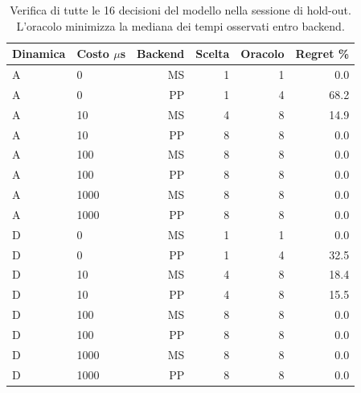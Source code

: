 \begin{table}[H]\centering\small
\caption{Verifica di tutte le 16 decisioni del modello nella sessione di hold-out. L'oracolo minimizza la mediana dei tempi osservati entro backend.}\label{tab:regret}
\begin{tabular}{@{}llrrrr@{}}
\toprule Dinamica & Costo $\mu$s & Backend & Scelta & Oracolo & Regret \%\\\midrule
A & 0 & MS & 1 & 1 & 0.0\\
A & 0 & PP & 1 & 4 & 68.2\\
A & 10 & MS & 4 & 8 & 14.9\\
A & 10 & PP & 8 & 8 & 0.0\\
A & 100 & MS & 8 & 8 & 0.0\\
A & 100 & PP & 8 & 8 & 0.0\\
A & 1000 & MS & 8 & 8 & 0.0\\
A & 1000 & PP & 8 & 8 & 0.0\\
D & 0 & MS & 1 & 1 & 0.0\\
D & 0 & PP & 1 & 4 & 32.5\\
D & 10 & MS & 4 & 8 & 18.4\\
D & 10 & PP & 4 & 8 & 15.5\\
D & 100 & MS & 8 & 8 & 0.0\\
D & 100 & PP & 8 & 8 & 0.0\\
D & 1000 & MS & 8 & 8 & 0.0\\
D & 1000 & PP & 8 & 8 & 0.0\\
\bottomrule\end{tabular}
\end{table}
